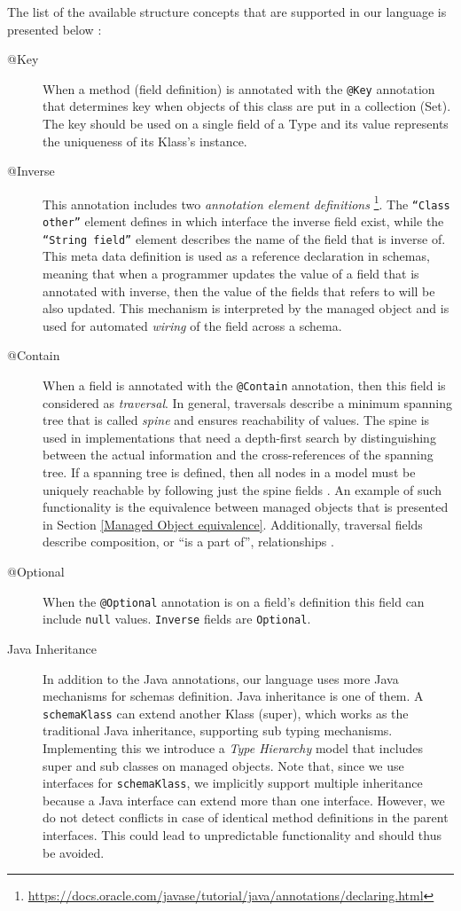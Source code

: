 The list of the available structure concepts that are supported in our language is presented below \cite{loh2012managed}:
\begin{description}
	\item [@Key] When a method (field definition) is annotated with the \texttt{@Key} annotation that determines key when objects of this class are put in a collection (Set).
	The key should be used on a single field of a Type and its value represents the uniqueness of its Klass's instance.

	\item [@Inverse] This annotation includes two \textit{annotation element definitions} \footnote{
		\url{https://docs.oracle.com/javase/tutorial/java/annotations/declaring.html}}.
	The \texttt{``Class other''} element defines in which interface the inverse field exist, while the \texttt{``String field''} element describes the name of the field that is inverse of.
	This meta data definition is used as a reference declaration in schemas, meaning that when a programmer updates the value of a field that is annotated with inverse, then the value of the fields that refers to will be also updated.
	This mechanism is interpreted by the managed object and is used for automated \textit{wiring} of the field across a schema.

	\item [@Contain] When a field is annotated with the \texttt{@Contain} annotation, then this field is considered as \textit{traversal}. 
	In general, traversals describe a minimum spanning tree that is called \textit{spine} and ensures reachability of values.
	The spine is used in implementations that need a depth-first search by distinguishing between the actual information and the cross-references of the spanning tree.
	If a spanning tree is defined, then all nodes in a model must be uniquely reachable by following just the spine fields \cite{storm2012object}.
	An example of such functionality is the equivalence between managed objects that is presented in Section \ref{Managed Object equivalence}.
	Additionally, traversal fields describe composition, or ``is a part of'', relationships \cite{loh2012managed}.

	\item [@Optional] When the \texttt{@Optional} annotation is on a field's definition this field can include \texttt{null} values.
	\texttt{Inverse} fields are \texttt{Optional}. 

	\item [Java Inheritance] In addition to the Java annotations, our language uses more Java mechanisms for schemas definition. 
	Java inheritance is one of them. 
	A \texttt{schemaKlass} can extend another Klass (super), which works as the traditional Java inheritance, supporting sub typing mechanisms.
	Implementing this we introduce a \textit{Type Hierarchy} model that includes super and sub classes on managed objects.
	Note that, since we use interfaces for \texttt{schemaKlass}, we implicitly support multiple inheritance because a Java interface can extend more than one interface.
	However, we do not detect conflicts in case of identical method definitions in the parent interfaces.
	This could lead to unpredictable functionality and should thus be avoided.


\end{description}
